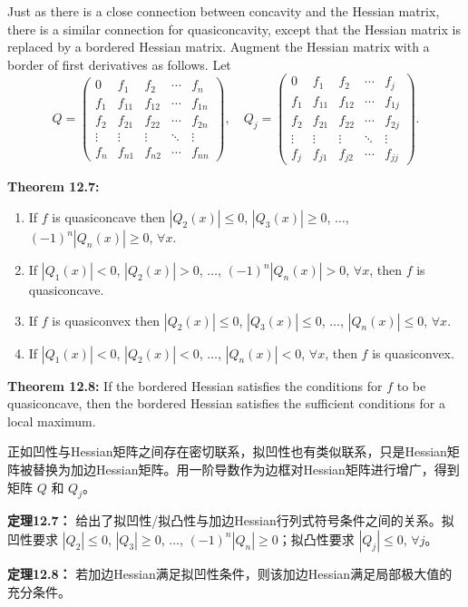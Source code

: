 \begin{original}
Just as there is a close connection between concavity and the Hessian matrix, there is a similar connection for quasiconcavity, except that the Hessian matrix is replaced by a bordered Hessian matrix. Augment the Hessian matrix with a border of first derivatives as follows. Let
\[
Q = \begin{pmatrix}
0 & f_1 & f_2 & \cdots & f_n \\
f_1 & f_{11} & f_{12} & \cdots & f_{1n} \\
f_2 & f_{21} & f_{22} & \cdots & f_{2n} \\
\vdots & \vdots & \vdots & \ddots & \vdots \\
f_n & f_{n1} & f_{n2} & \cdots & f_{nn}
\end{pmatrix}, \quad
Q_j = \begin{pmatrix}
0 & f_1 & f_2 & \cdots & f_j \\
f_1 & f_{11} & f_{12} & \cdots & f_{1j} \\
f_2 & f_{21} & f_{22} & \cdots & f_{2j} \\
\vdots & \vdots & \vdots & \ddots & \vdots \\
f_j & f_{j1} & f_{j2} & \cdots & f_{jj}
\end{pmatrix}.
\]

\textbf{Theorem 12.7:}
\begin{enumerate}
\item If $f$ is quasiconcave then $|Q_2(x)| \leq 0$, $|Q_3(x)| \geq 0$, $\ldots$, $(-1)^n|Q_n(x)| \geq 0$, $\forall x$.
\item If $|Q_1(x)| < 0$, $|Q_2(x)| > 0$, $\ldots$, $(-1)^n|Q_n(x)| > 0$, $\forall x$, then $f$ is quasiconcave.
\item If $f$ is quasiconvex then $|Q_2(x)| \leq 0$, $|Q_3(x)| \leq 0$, $\ldots$, $|Q_n(x)| \leq 0$, $\forall x$.
\item If $|Q_1(x)| < 0$, $|Q_2(x)| < 0$, $\ldots$, $|Q_n(x)| < 0$, $\forall x$, then $f$ is quasiconvex.
\end{enumerate}

\textbf{Theorem 12.8:} If the bordered Hessian satisfies the conditions for $f$ to be quasiconcave, then the bordered Hessian satisfies the sufficient conditions for a local maximum.
\end{original}
\begin{translation}
正如凹性与Hessian矩阵之间存在密切联系，拟凹性也有类似联系，只是Hessian矩阵被替换为加边Hessian矩阵。用一阶导数作为边框对Hessian矩阵进行增广，得到矩阵 $Q$ 和 $Q_j$。

\textbf{定理12.7：} 给出了拟凹性/拟凸性与加边Hessian行列式符号条件之间的关系。拟凹性要求 $|Q_2| \leq 0$, $|Q_3| \geq 0$, $\ldots$, $(-1)^n|Q_n| \geq 0$；拟凸性要求 $|Q_j| \leq 0$, $\forall j$。

\textbf{定理12.8：} 若加边Hessian满足拟凹性条件，则该加边Hessian满足局部极大值的充分条件。
\end{translation}

